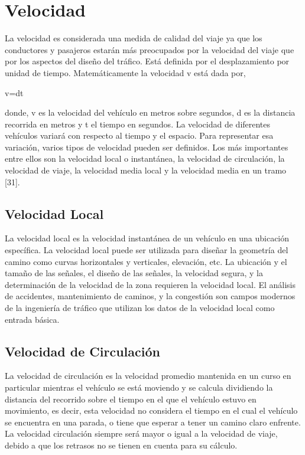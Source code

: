 \section{Velocidad}

La velocidad es considerada una medida de calidad del viaje ya que los conductores y pasajeros estarán más preocupados por la velocidad del viaje que por los aspectos del diseño del tráfico. Está definida por el desplazamiento por unidad de tiempo. Matemáticamente la velocidad v está dada por,

v=dt

donde, v es la velocidad del vehículo en metros sobre segundos, d es la distancia recorrida en metros y t el tiempo en segundos. La velocidad de diferentes vehículos variará con respecto al tiempo y el espacio. Para representar esa variación, varios tipos de velocidad pueden ser definidos. Los más importantes entre ellos son la velocidad local o instantánea, la velocidad de circulación, la velocidad de viaje, la velocidad media local y la velocidad media en un tramo [31].

\subsection{Velocidad Local}

La velocidad local es la velocidad instantánea de un vehículo en una ubicación específica. La velocidad local puede ser utilizada para diseñar la geometría del camino como curvas horizontales y verticales, elevación, etc. La ubicación y el tamaño de las señales, el diseño de las señales, la velocidad segura, y la determinación de la velocidad de la zona requieren la velocidad local. El análisis de accidentes, mantenimiento de caminos, y la congestión son campos modernos de la ingeniería de tráfico que utilizan los datos de la velocidad local como entrada básica. 

\subsection{Velocidad de Circulación}

La velocidad de circulación es la velocidad promedio mantenida en un curso en particular mientras el vehículo se está moviendo y se calcula dividiendo la distancia del recorrido sobre el tiempo en el que el vehículo estuvo en movimiento, es decir, esta velocidad no considera el tiempo en el cual el vehículo se encuentra en una parada, o tiene que esperar a tener un camino claro enfrente. La velocidad circulación siempre será mayor o igual a la velocidad de viaje, debido a que los retrasos no se tienen en cuenta para su cálculo.

